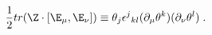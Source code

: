 \begin{equation}
\label{e5:48}
\frac{1}{2} tr(\Z \cdot [\E_{\mu},\E_{\nu}]) \equiv \theta_j \epsilon^j{}_{kl}(\partial_{\mu}\theta^k)(\partial_{\nu} \theta^l)\; .
\end{equation}

